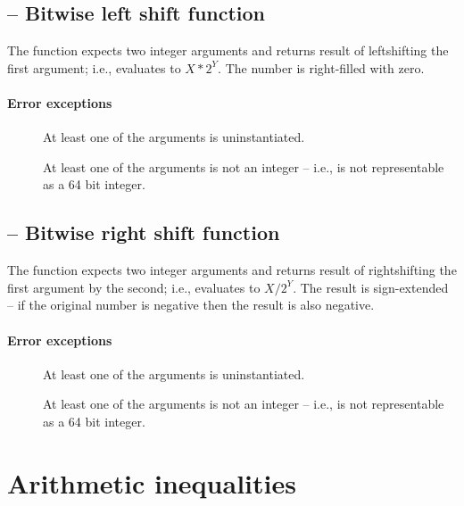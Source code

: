 \subsection{ -- Bitwise left shift function}
The  function expects two integer arguments and returns result of leftshifting the first argument; i.e.,  evaluates to $X*2^{Y}$. The number is right-filled with zero.

\paragraph{Error exceptions}
\begin{description}
\item[]
At least one of the arguments is uninstantiated.
\item[]
At least one of the arguments is not an integer -- i.e., is not representable as a 64 bit integer.
\end{description}
      
\subsection{ -- Bitwise right shift function}
The  function expects two integer arguments and returns result of rightshifting the first argument by the second; i.e.,  evaluates to $X/2^{Y}$. The result is sign-extended -- if the original number is negative then the result is also negative.

\paragraph{Error exceptions}
\begin{description}
\item[]
At least one of the arguments is uninstantiated.
\item[]
At least one of the arguments is not an integer -- i.e., is not representable as a 64 bit integer.
\end{description}

\section{Arithmetic inequalities}
\label{arith:ineq}

